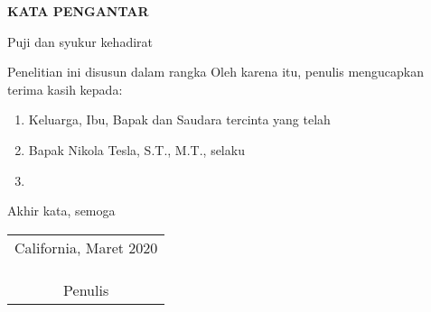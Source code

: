 \begin{center}
  \Large\textbf{KATA PENGANTAR}
\end{center}
\vspace{1ex}

\setlength{\parindent}{7ex}

Puji dan syukur kehadirat \lipsum[1][1-5]
\vspace{0.5ex}

Penelitian ini disusun dalam rangka \lipsum[1][1-5]
Oleh karena itu, penulis mengucapkan terima kasih kepada:
\vspace{0.5ex}

\begin{enumerate}[nolistsep]
  \item Keluarga, Ibu, Bapak dan Saudara tercinta yang telah \lipsum[1][1]
  \vspace{0.5ex}
  \item Bapak Nikola Tesla, S.T., M.T., selaku \lipsum[1][1-2]
  \vspace{0.5ex}
  \item \lipsum[1][1-3]
  \vspace{0.5ex}
\end{enumerate}
\vspace{0.5ex}

Akhir kata, semoga \lipsum[1][1-5]
\vspace{2ex}

\begin{flushright}
  \begin{tabular}[b]{c}
    California, Maret 2020
    \\
    \\
    \\
    \\
    Penulis
  \end{tabular}
\end{flushright}